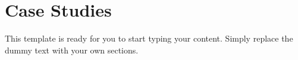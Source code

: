 \section{Case Studies}
This template is ready for you to start typing your content. Simply replace the dummy text with your own sections.